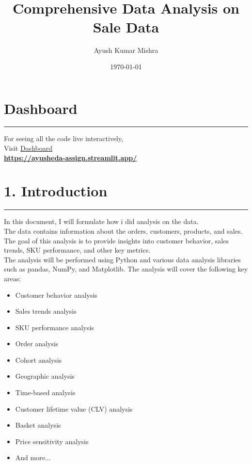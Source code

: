 \documentclass{article}
\title{\textcolor{primaryColor}{\Huge\textbf{Comprehensive Data Analysis on Sale Data}}}
\author{\textcolor{secondaryColor}{\Large Ayush Kumar Mishra}}
\date{\textcolor{secondaryColor}{\today}}
\begin{document}
\maketitle

\newpage
\section*{Dashboard}
  \begin{center}
        \color{red}\rule{1\linewidth}{1mm}
    \end{center}
\begin{center}
\vspace{2in}
    {\Huge  For seeing all the code live interactively, \\
    \vspace{2in}
    Visit  \href{https://ayusheda-assign.streamlit.app/}{Dashboard}}\\
    
    \vspace{0.7in}
   \textbf{ \href{https://ayusheda-assign.streamlit.app/}{https://ayusheda-assign.streamlit.app/}}
\end{center}

\newpage
\tableofcontents

\newpage
\section{1. Introduction}
  \begin{center}
        \color{red}\rule{1\linewidth}{1mm}
    \end{center}
In this document, I will formulate how i did analysis on the data.\\
The data contains information about the orders, customers, products, and sales.\\
The goal of this analysis is to provide insights into customer behavior, sales trends, SKU performance, and other key metrics.\\
The analysis will be performed using Python and various data analysis libraries such as pandas, NumPy, and Matplotlib.
The analysis will cover the following key areas:
\begin{itemize}
    \item Customer behavior analysis
    \item Sales trends analysis
    \item SKU performance analysis
    \item Order analysis
    \item Cohort analysis
    \item Geographic analysis
    \item Time-based analysis
    \item Customer lifetime value (CLV) analysis    
    \item Basket analysis
    \item Price sensitivity analysis
    \item And more...
\end{itemize}
\end{document}

